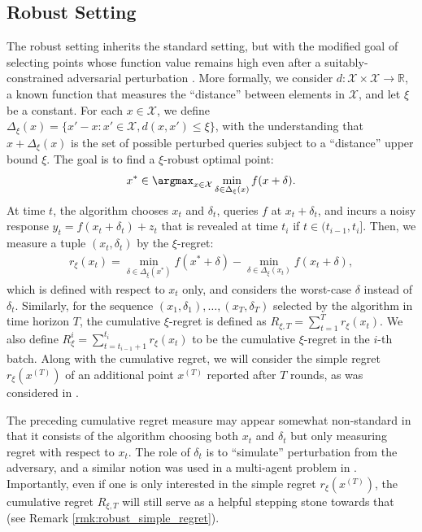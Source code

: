 \documentclass[10pt]{article}
\begin{document}
\subsection{Robust Setting}
\label{sec:setup_robust}
The robust setting inherits the standard setting, but with the modified goal of selecting points whose function value remains high even after a suitably-constrained adversarial perturbation  \citep{Bogunovic18}.
More formally, we consider $d:\mathcal{X}\times\mathcal{X} \to \mathbb{R}$, a known function that measures the ``distance'' between elements in $\mathcal{X}$, and let $\xi$ be a constant.
For each $x\in\mathcal{X}$, we define $\Delta_{\xi}(x) = \{x'-x:x'\in\mathcal{X},d(x,x')\leq \xi\} $, with the understanding that $x+\Delta_\xi(x)$ is the set of possible perturbed queries subject to a ``distance'' upper bound $\xi$.
The goal is to find a $\xi$-robust optimal point:
\begin{align}
    x^* \in \argmax_{x\in{\mathcal{X}}}\min_{\delta\in\Delta_{\xi}(x)}f(x+\delta).
\end{align}
At time $t$, the algorithm chooses $x_t$ and $\delta_t$, queries $f$ at $x_t+\delta_t$, and incurs a noisy response $y_t = f(x_t+\delta_t)+z_t $ that is revealed at time $t_i $ if $t\in (t_{i-1}, t_i]$. 
Then, we measure a tuple $(x_t,\delta_t)$ by the $\xi$-regret:
\begin{align}
    r_{\xi}(x_t) = \min_{\delta\in\Delta_{\xi}(x^*)}f(x^* + \delta) - \min_{\delta\in\Delta_{\xi}(x_t)}f(x_t+\delta), \label{eq:xi_regret}
\end{align}
which is defined with respect to $x_t$ only, and considers the worst-case $\delta$ instead of $\delta_t$. %
Similarly, for the sequence $(x_1,\delta_1), \ldots, (x_T,\delta_T)$ selected by the algorithm in time horizon $T$, the cumulative $\xi$-regret is defined as $R_{\xi,T} = \sum_{t=1}^T r_{\xi}(x_t) $. We also define $R^i_{\xi}=\sum_{t=t_{i-1}+1}^{t_i} r_{\xi}(x_t)$ to be the cumulative $\xi$-regret in the $i$-th batch.  Along with the cumulative regret, we will consider the simple regret $r_{\xi}(x^{(T)})$ of an additional point $x^{(T)}$ reported after $T$ rounds, as was considered in \citep{Bogunovic18}.

The preceding cumulative regret measure may appear somewhat non-standard in that it consists of the algorithm choosing both $x_t$ and $\delta_t$ but only measuring regret with respect to $x_t$.  The role of $\delta_t$ is to ``simulate'' perturbation from the adversary, and a similar notion was used in a multi-agent problem in \citep{Tay23}.  Importantly, even if one is only interested in the simple regret $r_{\xi}(x^{(T)})$, the cumulative regret $R_{\xi,T}$ will still serve as a helpful stepping stone towards that (see Remark \ref{rmk:robust_simple_regret}).
\end{document}
